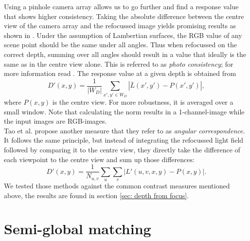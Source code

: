 \documentclass  [
  paper    = a4,
  BCOR     = 10mm,
  twoside,
  fontsize = 12pt,
  fleqn,
  toc      = bibnumbered,
  toc      = listofnumbered,
  numbers  = noendperiod,
  headings = normal,
  listof   = leveldown,
  version  = 3.03
]                                       {scrreprt}
\begin{document}
Using a pinhole camera array allows us to go further and find a response value that shows higher consistency. Taking the absolute difference between the centre view of the camera array and the refocussed image yields promising results as shown in \cite{tao2017shape}. Under the assumption of Lambertian surfaces, the RGB value of any scene point should be the same under all angles. Thus when refocussed on the correct depth, summing over all angles should result in a value that ideally is the same as in the centre view alone. This is referred to as \textit{photo consistency}; for more information read \cite{tao2017shape}.
The response value at a given depth is obtained from
\begin{equation}\label{key}
D'(x,y) = \frac{1}{|W_D|}\sum_{x',y' \in W_D} \left|\bar{L}(x',y')- P(x', y')\right|,
\end{equation}
where $P(x,  y)$ is the centre view. For more robustness, it is averaged over a small window. Note that calculating the norm results in a 1-channel-image while the input images are RGB-images. \\ Tao et al. propose another measure that they refer to as \textit{angular correspondence}. It follows the same principle, but instead of integrating the refocussed light field followed by comparing it to the centre view, they directly take the difference of each viewpoint to the centre view and sum up those differences:
\begin{equation}\label{eq:responsecorr}
D'(x,y) = \frac{1}{N_{u,v}}\sum_{u}\sum_{v}  \left|L'(u, v, x, y) - P(x,y)\right|.
\end{equation}
We tested those methods against the common contrast measures mentioned above, the results are found in section \ref{sec: depth from focus}.

\section{Semi-global matching}
\end{document}
